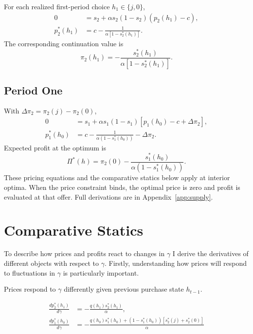 \documentclass[12pt]{article}
\newtheorem{proposition}{Proposition}
\theoremstyle{definition}
\theoremstyle{remark}
\begin{document}
\label{subsec:foc}
For each realized first-period choice $h_1\in\{j,0\}$,
\begin{align}
0&=s_2+\alpha s_2(1-s_2)(p_2(h_1)-c),\\
 p_2^*(h_1)&=c-\frac{1}{\alpha[1-s_2^*(h_1)]}.
 \label{eq:supply-terminal}
\end{align}
The corresponding continuation value is
\begin{equation}
 \pi_2(h_1)=-\frac{s_2^*(h_1)}{\alpha[1-s_2^*(h_1)]}.
\end{equation}

\subsection{Period One}
\label{subsec:price-derivation}
With $\Delta \pi_2=\pi_2(j)-\pi_2(0)$,
\begin{align}
  0&=s_1+\alpha s_1(1-s_1)[p_1(h_0)-c+\Delta \pi_2],\\
  p_1^*(h_0)&=c-\frac{1}{\alpha(1-s^*_1(h_0))}-\Delta \pi_2.
 \label{eq:supply-first}
\end{align}
Expected profit at the optimum is
\begin{equation}
  \Pi^*(h)=\pi_2(0) - \frac{s^*_1(h_0)}{\alpha(1-s^*_1(h_0))}.
\end{equation}
These pricing equations and the comparative statics below apply at interior optima. When the price constraint binds, the optimal price is zero and profit is evaluated at that offer.
Full derivations are in Appendix~\ref{app:supply}.

\section{Comparative Statics}
\label{sec:comparative-statics}

To describe how prices and profits react to changes in $\gamma$ I derive the derivatives of different objects with respect to $\gamma$. Firstly, understanding how prices will respond to fluctuations in $\gamma$ is particularly important.

  Prices respond to $\gamma$ differently given previous purchase state $h_{t-1}$.

\begin{align}
  \frac{dp_2^*(h_1)}{d\gamma} &= -\frac{q(h_1)s_2^*(h_1)}{\alpha}, \\
  \frac{dp_1^*(h_0)}{d\gamma} &= -\frac{q(h_0)s_1^*(h_0) + (1-s_1^*(h_0))[s_2^*(j) + s_2^*(0)]}{\alpha}
 \label{eq:supply-gamma-prices}
\end{align}
\end{document}
